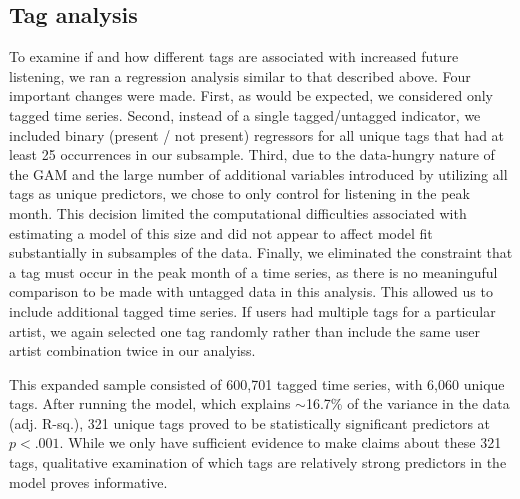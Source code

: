 \subsection{Tag analysis}
To examine if and how different tags are associated with increased future listening, we ran a regression analysis similar to that described above. Four important changes were made. First, as would be expected, we considered only tagged time series.  Second, instead of a single tagged/untagged indicator, we included binary (present / not present) regressors for all unique tags that had at least 25 occurrences in our subsample. Third, due to the data-hungry nature of the GAM and the large number of additional variables introduced by utilizing all tags as unique predictors, we chose to only control for listening in the peak month. This decision limited the computational difficulties associated with estimating a model of this size and did not appear to affect model fit substantially in subsamples of the data. Finally, we eliminated the constraint that a tag must occur in the peak month of a time series, as there is no meaninguful comparison to be made with untagged data in this analysis. This allowed us to include additional tagged time series. If users had multiple tags for a particular artist, we again selected one tag randomly rather than include the same user artist combination twice in our analyiss.

This expanded sample consisted of 600,701 tagged time series, with 6,060 unique tags. After running the model, which explains $\sim$16.7\% of the variance in the data (adj. R-sq.), 321 unique tags proved to be statistically significant predictors at $p <.001$. While we only have sufficient evidence to make claims about these 321 tags, qualitative examination of which tags are relatively strong predictors in the model proves informative.

